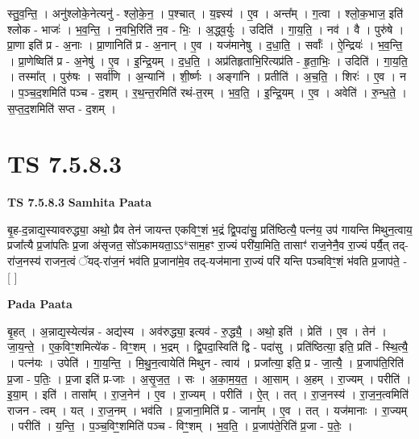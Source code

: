 \documentclass[17pt]{extarticle}
\begin{document}
स्तु॒व॒न्ति॒ । अनु॑श्लोके॒नेत्यनु॑ - श्लो॒के॒न॒ । प॒श्चात् । य॒ज्ञ्स्य॑ । ए॒व । अन्त᳚म् । ग॒त्वा । श्लो॒क॒भाज॒ इति॑ श्लोक - भाजः॑ । भ॒व॒न्ति॒ । न॒वभि॒रिति॑ न॒व - भिः॒ । अ॒द्ध्व॒र्युः । उदिति॑ । गा॒य॒ति॒ । नव॑ । वै । पुरु॑षे । प्रा॒णा इति॑ प्र - अ॒नाः । प्रा॒णानिति॑ प्र - अ॒नान् । ए॒व । यज॑मानेषु । द॒धा॒ति॒ । सर्वाः᳚ । ऐ॒न्द्रियः॑ । भ॒व॒न्ति॒ । प्रा॒णेष्विति॑ प्र - अ॒नेषु॑ । ए॒व । इ॒न्द्रि॒यम् । द॒ध॒ति॒ । अप्र॑तिहृताभि॒रित्यप्र॑ति - हृ॒ता॒भिः॒ । उदिति॑ । गा॒य॒ति॒ । तस्मा᳚त् । पुरु॑षः । सर्वा॑णि । अ॒न्यानि॑ । शी॒र्ष्णः । अङ्गा॑नि । प्रतीति॑ । अ॒च॒ति॒ । शिरः॑ । ए॒व । न । प॒ञ्च॒द॒शमिति॑ पञ्च - द॒शम् । र॒थ॒न्त॒रमिति॑ रथं-त॒रम् । भ॒व॒ति॒ । इ॒न्द्रि॒यम् । ए॒व । अवेति॑ । रु॒न्ध॒ते॒ । स॒प्त॒द॒शमिति॑ सप्त - द॒शम् ।  \newline




\section*{ TS 7.5.8.3 }

\textbf{TS 7.5.8.3 } \newline
\textbf{Samhita Paata} \newline

बृ॒ह-द॒न्नाद्य॒स्यावरुद्ध्या॒ अथो॒ प्रैव तेन॑ जायन्त एकविꣳ॒॒शं भ॒द्रं द्वि॒पदा॑सु॒ प्रति॑ष्ठित्यै॒ पत्न॑य॒ उप॑ गायन्ति मिथुन॒त्वाय॒ प्रजा᳚त्यै प्र॒जा॑पतिः प्र॒जा अ॑सृजत॒ सो॑ऽकामयता॒ऽऽ*साम॒हꣳ रा॒ज्यं परी॑या॒मिति॒ तासाꣳ॑ राज॒नेनै॒व रा॒ज्यं पर्यै॒त् तद्-रा॑ज॒नस्य॑ राजन॒त्वं ॅयद्-रा॑ज॒नं भव॑ति प्र॒जाना॑मे॒व तद्-यज॑माना रा॒ज्यं परि॑ यन्ति पञ्चविꣳ॒॒शं भ॑वति प्र॒जाप॑ते॒ - [  ] \newline

\textbf{Pada Paata} \newline

बृ॒हत् । अ॒न्नाद्य॒स्येत्य॑न्न - अद्य॑स्य । अव॑रुद्ध्या॒ इत्यव॑ - रु॒द्ध्यै॒ । अथो॒ इति॑ । प्रेति॑ । ए॒व । तेन॑ । जा॒य॒न्ते॒ । ए॒क॒विꣳ॒॒शमित्ये॑क - विꣳ॒॒शम् । भ॒द्रम् । द्वि॒पदा॒स्विति॑ द्वि - पदा॑सु । प्रति॑ष्ठित्या॒ इति॒ प्रति॑ - स्थि॒त्यै॒ । पत्न॑यः । उपेति॑ । गा॒य॒न्ति॒ । मि॒थु॒न॒त्वायेति॑ मिथुन - त्वाय॑ । प्रजा᳚त्या॒ इति॒ प्र - जा॒त्यै॒ । प्र॒जाप॑ति॒रिति॑ प्र॒जा - प॒तिः॒ । प्र॒जा इति॑ प्र-जाः । अ॒सृ॒ज॒त॒ । सः । अ॒का॒म॒य॒त॒ । आ॒साम् । अ॒हम् । रा॒ज्यम् । परीति॑ । इ॒या॒म् । इति॑ । तासा᳚म् । रा॒ज॒नेन॑ । ए॒व । रा॒ज्यम् । परीति॑ । ऐ॒त् । तत् । रा॒ज॒नस्य॑ । रा॒ज॒न॒त्वमिति॑ राजन - त्वम् । यत् । रा॒ज॒नम् । भव॑ति । प्र॒जाना॒मिति॑ प्र - जाना᳚म् । ए॒व । तत् । यज॑मानाः । रा॒ज्यम् । परीति॑ । य॒न्ति॒ । प॒ञ्च॒विꣳ॒॒शमिति॑ पञ्च - विꣳ॒॒शम् । भ॒व॒ति॒ । प्र॒जाप॑ते॒रिति॑ प्र॒जा - प॒तेः॒ ।  \newline
\end{document}
